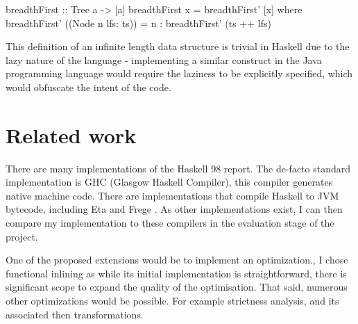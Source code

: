 \documentclass[float=false, crop=false]{standalone}
\begin{document}
\begin{minipage}{\linewidth}
\begin{HaskellLst}
breadthFirst :: Tree a -> [a]
breadthFirst x = breadthFirst' [x]
  where
    breadthFirst' ((Node n lfs: ts)) =
      n : breadthFirst' (ts ++ lfs)
\end{HaskellLst}
\end{minipage}
This definition of an infinite length data structure is trivial in 
Haskell due to the lazy nature of the language - implementing
a similar construct in the Java programming language would 
require the laziness to be explicitly specified, which 
would obfuscate the intent of the code. 





  

\section{Related work}

There are many implementations of the Haskell 98 report.
The de-facto standard implementation is GHC \cite{ghc} (Glasgow Haskell
Compiler), this compiler generates native machine code. There
are implementations that compile Haskell to JVM bytecode, including Eta \cite{eta} and Frege \cite{frege}. 
As other implementations exist, I can then 
compare my implementation to these compilers in the evaluation stage
of the project. 

One of the proposed extensions would be to implement an optimization.,
I chose functional inlining as while its initial implementation is straightforward, 
there is significant scope to expand the quality of the optimisation. 
That said, numerous other optimizations would be possible. 
For example strictness analysis, and its associated then transformations. 
\end{document}
